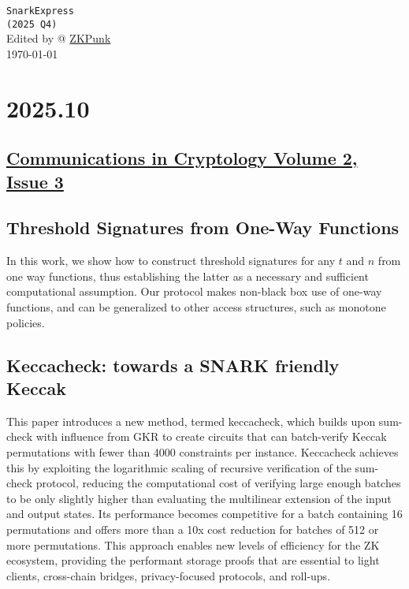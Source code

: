 \documentclass[11pt,oneside]{book}
\theoremstyle{definition}
\theoremstyle{remark}
\theoremstyle{plain}
\begin{document}
\thispagestyle{empty}
\begin{center}
\vfill
{\Huge \texttt{SnarkExpress} }\\[0.8em]
{\LARGE\texttt{(2025 Q4)}}\\[2em]
{Edited by  @ \href{https://zkpunk.pro}{ZKPunk}}\\[1em]
{\large\today}
\vfill
\end{center}
\newpage

\tableofcontents
\newpage

\chapter{2025.10}

\section{\href{https://cic.iacr.org/i/2/3}{Communications in Cryptology Volume 2, Issue 3}}
\section{\cite{cryptoeprint:2025/1762} Threshold Signatures from One-Way Functions}
In this work, we show how to construct threshold signatures for any $t$ and $n$ from one way functions, thus establishing the latter as a necessary and sufficient computational assumption. Our protocol makes non-black box use of one-way functions, and can be generalized to other access structures, such as monotone policies.

\section{\cite{cryptoeprint:2025/1764} Keccacheck: towards a SNARK friendly Keccak}
This paper introduces a new method, termed keccacheck, which builds upon sum-check with influence from GKR to create circuits that can batch-verify Keccak permutations with fewer than 4000 constraints per instance. Keccacheck achieves this by exploiting the logarithmic scaling of recursive verification of the sum-check protocol, reducing the computational cost of verifying large enough batches to be only slightly higher than evaluating the multilinear extension of the input and output states. Its performance becomes competitive for a batch containing 16 permutations and offers more than a 10x cost reduction for batches of 512 or more permutations. This approach enables new levels of efficiency for the ZK ecosystem, providing the performant storage proofs that are essential to light clients, cross-chain bridges, privacy-focused protocols, and roll-ups.
\end{document}
